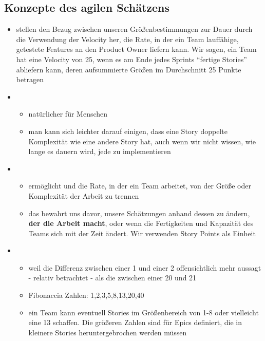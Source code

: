 \subsection{Konzepte des agilen Schätzens}
\begin{itemize}
  \item stellen den Bezug zwischen unseren Größenbestimmungen zur Dauer
    durch die Verwendung der Velocity her, die Rate, in der ein Team lauffähige,
    getestete Features an den Product Owner liefern kann. Wir sagen, ein Team
    hat eine Velocity von 25, wenn es am Ende jedes Sprints \enquote{fertige Stories}
    abliefern kann, deren aufsummierte Größen im Durchschnitt 25 Punkte betragen
  \item {}
    \begin{itemize}
      \item natürlicher für Menschen
      \item man kann sich leichter darauf einigen, dass eine Story doppelte Komplexität wie
        eine andere Story hat, auch wenn wir nicht wissen, wie lange es dauern wird, jede zu
        implementieren
    \end{itemize}
  \item {}
    \begin{itemize}
      \item ermöglicht und die Rate, in der ein Team arbeitet, von der Größe oder Komplexität der Arbeit zu trennen
      \item das bewahrt uns davor, unsere Schätzungen anhand dessen zu ändern, \textbf{der die Arbeit
          macht}, oder wenn die Fertigkeiten und Kapazität des Teams sich mit der Zeit ändert. Wir
        verwenden Story Points als Einheit
    \end{itemize}
  \item {}
    \begin{itemize}
      \item weil die Differenz zwischen einer 1 und einer 2 offensichtlich mehr
        aussagt - relativ betrachtet - als die zwischen einer 20 und 21
      \item Fibonaccia Zahlen: 1,2,3,5,8,13,20,40
      \item ein Team kann eventuell Stories im Größenbereich von 1-8 oder vielleicht eine 13
        schaffen. Die größeren Zahlen sind für Epics definiert, die in kleinere Stories
        heruntergebrochen werden müssen
    \end{itemize}
\end{itemize}


